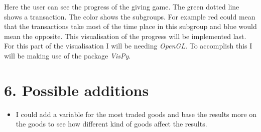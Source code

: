 \documentclass{article}
\begin{document}
Here the user can see the progress of the giving game. The green dotted line shows a transaction. The color shows the subgroups. For example red could mean that the transactions take most of the time place in this subgroup and blue would mean the opposite. This visualisation of the progress will be implemented last. For this part of the visualisation I will be needing \textit{OpenGL}. To accomplish this I will be making use of the package \textit{VisPy}.

\section{6. Possible additions}
\begin{itemize}
  \item I could add a variable for the most traded goods and base the results more on the goods to see how different kind of goods affect the results. 
\end{itemize}





\end{document}
